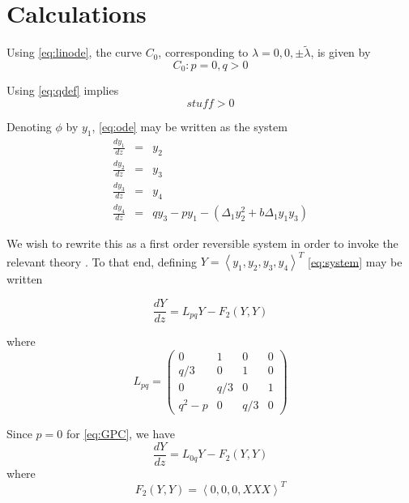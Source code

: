 \section{Calculations}

Using \eqref{eq:linode}, the curve $C_0$, corresponding to $\lambda = 0,0,\pm \tilde{ \lambda } $, is given by
\begin{equation}
C_0: { p=0, q > 0 }
\end{equation}

Using \eqref{eq:qdef} implies
\begin{equation}
stuff > 0
\end{equation}

Denoting $\phi$ by $y_1$, \eqref{eq:ode} may be written as the system
\begin{subequations}\label{eq:system}
\begin{eqnarray}
\frac{d y_1 }{d z} &=& y_2 \\
\frac{d y_2 }{d z} &=& y_3 \\
\frac{d y_3 }{d z} &=& y_4 \\
\frac{d y_4 }{d z} &=& q y_3 - p y_1 - \left(\Delta_1 y_2^2 + b \Delta_1 y_1 y_3 \right)
\end{eqnarray}
\end{subequations}

We wish to rewrite this as a first order reversible system in order to invoke the relevant theory \cite{IA}. 
To that end, defining  $Y=\left<y_1,y_2,y_3,y_4\right>^T$ \eqref{eq:system} may be written 

\begin{equation}\label{eq:bilinear}
\frac{ dY }{ dz } = L_{pq} Y - F_2(Y,Y)
\end{equation}

where 
\begin{equation}
L_{pq} = \left( 
\begin{array}{cccc}
0&1&0&0\\
q/3&0&1&0\\
0&q/3&0&1\\
q^2 - p &0&q/3&0 \end{array} \right)
 \end{equation}

Since $p=0$ for \eqref{eq:GPC}, we have 
\begin{equation} \label{eq:bilinear2}
 \frac{ dY }{ dz } = L_{0q} Y - F_2(Y,Y) 
\end{equation}
where 
\begin{equation}\label{eq:nonlinear}
F_2(Y,Y) = \left<0,0,0,XXX\right>^T
\end{equation}

